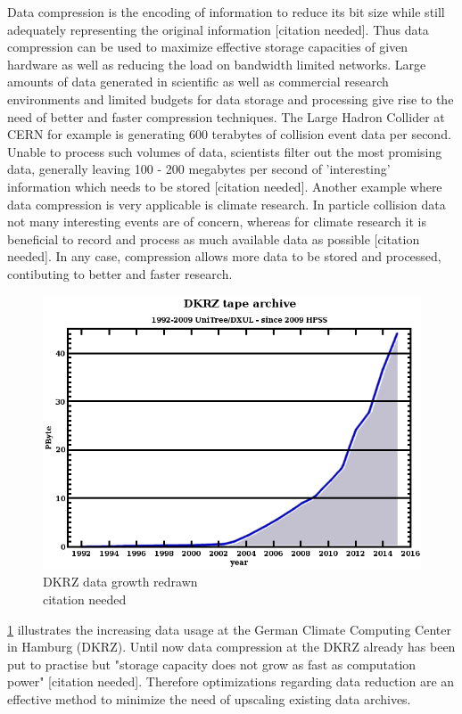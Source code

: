 \documentclass[
	12pt,
	a4paper,
	BCOR10mm,
	DIV14,
	headsepline,
]{scrreprt}
\begin{document}
\bigskip

Data compression is the encoding of information to reduce its bit size while
still adequately representing the original information [citation needed].
Thus data compression can be used to maximize effective storage capacities of
given hardware as well as reducing the load on bandwidth limited networks.
Large amounts of data generated in scientific as well as commercial research
environments and limited budgets for data storage and processing give rise to
the need of better and faster compression techniques. The Large Hadron Collider
at CERN for example is generating 600 terabytes of collision event data per
second. Unable to process such volumes of data, scientists filter out the most
promising data, generally leaving 100 - 200 megabytes per second of 'interesting'
information which needs to be stored [citation needed]. Another example where
data compression is very applicable is climate research. In particle collision
data not many interesting events are of concern, whereas for climate research it is
beneficial to record and process as much available data as possible
[citation needed]. In any case, compression allows more data to be stored and
processed, contibuting to better and faster research.

\begin{figure}
	\includegraphics[width=0.9\linewidth]{DKRZ_data_growth.png}
	\caption{DKRZ data growth redrawn\\ citation needed}
	\label{fig:dkrz}
\end{figure}

\cref{fig:dkrz} illustrates the increasing data usage at the German Climate
Computing Center in Hamburg (DKRZ). Until now data compression at the DKRZ
already has been put to practise but "storage capacity does not grow as fast as
computation power" [citation needed]. Therefore optimizations regarding data
reduction are an effective method to minimize the need of upscaling existing
data archives.
\end{document}
